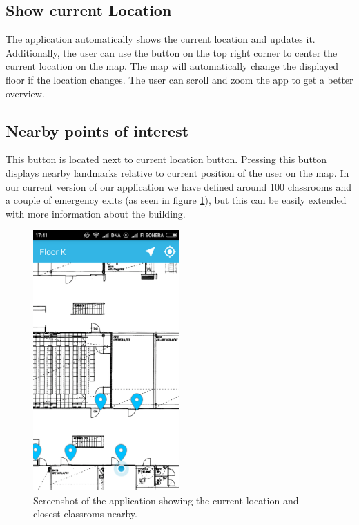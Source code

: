 \documentclass{article}
\begin{document}
\subsection{Show current Location} 

The application automatically shows the current location and updates it. Additionally, the user can use the button on the top right corner to center the current location on the map. The map will automatically change the displayed floor if the location changes.
The user can scroll and zoom the app to get a better overview.

\subsection{Nearby points of interest} 

This button is located next to current location button. Pressing this button displays nearby landmarks relative to current position of the user on the map. In our current version of our application we have defined around 100 classrooms and a couple of emergency exits (as seen in figure \ref{fig:location}), but this can be easily extended with more information about the building. 

\begin{figure}
    \centering
    \includegraphics[width=0.5\textwidth]{Location}
    \caption{Screenshot of the application showing the current location and closest classroms nearby.}
    \label{fig:location}
\end{figure}
\end{document}
